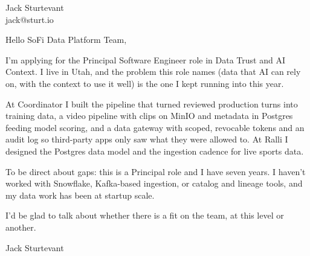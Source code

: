 \documentclass[11pt]{article}
\begin{document}
\raggedright

{\namefont\fontsize{20pt}{24pt}\selectfont Jack Sturtevant}\\[-0.3em]
jack@sturt.io

\vspace{1.2em}

Hello SoFi Data Platform Team,

I'm applying for the Principal Software Engineer role in Data Trust and AI Context. I live in Utah, and the problem this role names (data that AI can rely on, with the context to use it well) is the one I kept running into this year.

At Coordinator I built the pipeline that turned reviewed production turns into training data, a video pipeline with clips on MinIO and metadata in Postgres feeding model scoring, and a data gateway with scoped, revocable tokens and an audit log so third-party apps only saw what they were allowed to. At Ralli I designed the Postgres data model and the ingestion cadence for live sports data.

To be direct about gaps: this is a Principal role and I have seven years. I haven't worked with Snowflake, Kafka-based ingestion, or catalog and lineage tools, and my data work has been at startup scale.

I'd be glad to talk about whether there is a fit on the team, at this level or another.

\vspace{0.6em}
Jack Sturtevant
\end{document}
